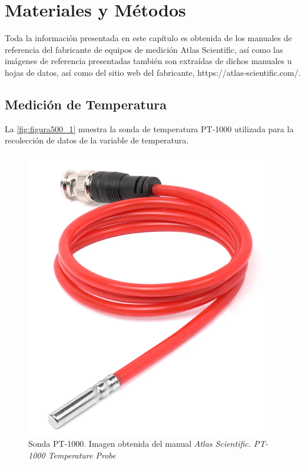 \chapter{Materiales y Métodos}
\label{ch:Instrumentacion}

Toda la información presentada en este capítulo es obtenida de los manuales de referencia del fabricante de equipos de medición Atlas Scientific, así como las imágenes de referencia presentadas también son extraídas de 
dichos manuales u hojas de datos, así como del sitio web del fabricante, https://atlas-scientific.com/.

\section{Medición de Temperatura}


La \autoref{fig:figura500_1} muestra la sonda de temperatura PT-1000 utilizada para la recolección de datos de la variable de temperatura.

\begin{figure}[h]
	\centering
	\includegraphics[scale=0.5]{imgss110.png}
	\caption{Sonda PT-1000. Imagen obtenida del manual \textit{Atlas Scientific. PT-1000 Temperature Probe}}
	\label{fig:figura500_1}
\end{figure}

